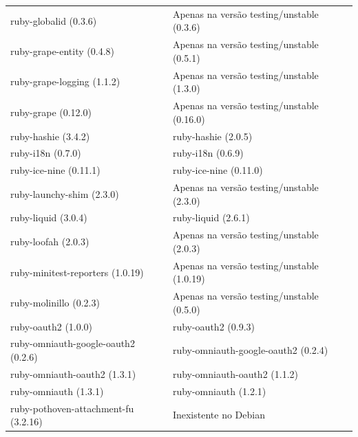 \begin{anexosenv}
\begin{longtable}[H]{l|l}
        ruby-globalid (0.3.6)                            & Apenas na versão testing/unstable (0.3.6)  \\ 
        ruby-grape-entity (0.4.8)                        & Apenas na versão testing/unstable (0.5.1)  \\ 
        ruby-grape-logging (1.1.2)                       & Apenas na versão testing/unstable (1.3.0)  \\ 
        ruby-grape (0.12.0)                              & Apenas na versão testing/unstable (0.16.0) \\ 
        ruby-hashie (3.4.2)                              & ruby-hashie (2.0.5)                                               \\ 
        ruby-i18n (0.7.0)                                & ruby-i18n (0.6.9)                                                 \\ 
        ruby-ice-nine (0.11.1)                           & ruby-ice-nine (0.11.0)                                            \\ 
        ruby-launchy-shim (2.3.0)                        & Apenas na versão testing/unstable (2.3.0)  \\ 
        ruby-liquid (3.0.4)                              & ruby-liquid (2.6.1)                                               \\ 
        ruby-loofah (2.0.3)                              & Apenas na versão testing/unstable (2.0.3)  \\ 
        ruby-minitest-reporters (1.0.19)                 & Apenas na versão testing/unstable (1.0.19) \\ 
        ruby-molinillo (0.2.3)                           & Apenas na versão testing/unstable (0.5.0)  \\ 
        ruby-oauth2 (1.0.0)                              & ruby-oauth2 (0.9.3)                                               \\ 
        ruby-omniauth-google-oauth2 (0.2.6)              & ruby-omniauth-google-oauth2 (0.2.4)                               \\ 
        ruby-omniauth-oauth2 (1.3.1)                     & ruby-omniauth-oauth2 (1.1.2)                                      \\ 
        ruby-omniauth (1.3.1)                            & ruby-omniauth (1.2.1)                                             \\ 
        ruby-pothoven-attachment-fu (3.2.16)             & Inexistente no Debian                                             \\ 

\end{longtable}
\end{anexosenv}

